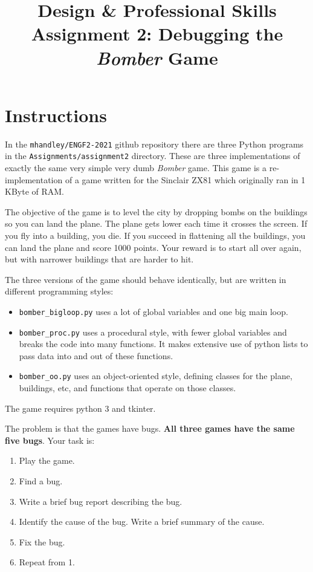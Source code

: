 \documentclass{article}
\title{Design \& Professional Skills\\
  Assignment 2: Debugging the {\em Bomber} Game}
\author{}
\date{}
\begin{document}
\maketitle

\section*{Instructions}

In the {\tt mhandley/ENGF2-2021} github repository there are three
Python programs in the {\tt Assignments/assignment2} directory.  These
are three implementations of exactly the same very simple very dumb
{\em Bomber} game. This game is a re-implementation of a game written for
the Sinclair ZX81 which originally ran in 1 KByte of RAM.

The objective of the game is to level the city by dropping bombs on
the buildings so you can land the plane.  The plane gets lower each
time it crosses the screen.  If you fly into a building, you die.  If
you succeed in flattening all the buildings, you can land the plane
and score 1000 points.  Your reward is to start all over again, but
with narrower buildings that are harder to hit.  

The three versions of the game should behave identically, but are written in different programming styles:
\begin{itemize}
\item {\tt bomber\_bigloop.py} uses a lot of global variables and one big main loop.
\item{\tt bomber\_proc.py} uses a procedural style, with fewer global variables and breaks the code into many functions.  It makes extensive use of python lists to pass data into and out of these functions.
\item{\tt bomber\_oo.py} uses an object-oriented style, defining classes for the plane, buildings, etc, and functions that operate on those classes.
\end{itemize}
The game requires python 3 and tkinter.

The problem is that the games have bugs.  \textbf{All three games have the same five bugs}.  Your task is:
\begin{enumerate}
\item Play the game.
\item Find a bug.
\item Write a brief bug report describing the bug.
\item Identify the cause of the bug.  Write a brief summary of the cause.
\item Fix the bug.
\item Repeat from 1.
\end{enumerate}
\end{document}
